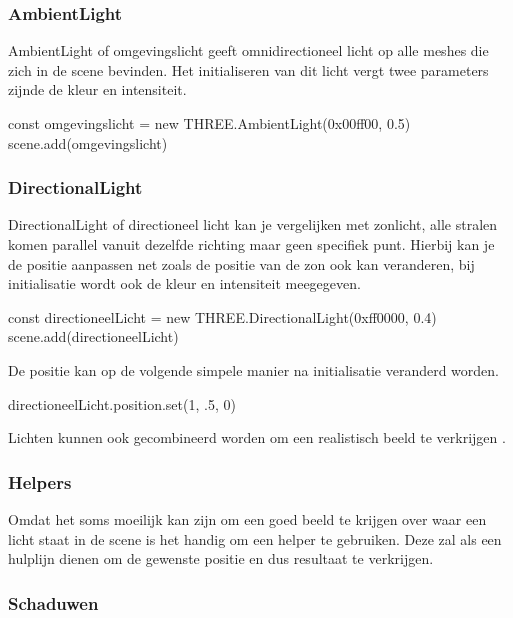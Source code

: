 \subsubsection{AmbientLight}

AmbientLight of omgevingslicht geeft omnidirectioneel licht op alle meshes die zich in de scene bevinden. Het initialiseren van dit licht vergt twee parameters zijnde de kleur en intensiteit.

\begin{LVerbatim}
const omgevingslicht = new THREE.AmbientLight(0x00ff00, 0.5)
scene.add(omgevingslicht)
\end{LVerbatim}

\subsubsection{DirectionalLight}

DirectionalLight of directioneel licht kan je vergelijken met zonlicht, alle stralen komen parallel vanuit dezelfde richting maar geen specifiek punt. Hierbij kan je de positie aanpassen net zoals de positie van de zon ook kan veranderen, bij initialisatie wordt ook de kleur en intensiteit meegegeven.

\begin{LVerbatim}
const directioneelLicht = new THREE.DirectionalLight(0xff0000, 0.4)
scene.add(directioneelLicht)
\end{LVerbatim}

De positie kan op de volgende simpele manier na initialisatie veranderd worden.

\begin{LVerbatim}
directioneelLicht.position.set(1, .5, 0)
\end{LVerbatim}

Lichten kunnen ook gecombineerd worden om een realistisch beeld te verkrijgen  \autocite{Simon2023}.

\subsubsection{Helpers}

Omdat het soms moeilijk kan zijn om een goed beeld te krijgen over waar een licht staat in de scene is het handig om een helper te gebruiken. Deze zal als een hulplijn dienen om de gewenste positie en dus resultaat te verkrijgen.

\subsubsection{Schaduwen}

